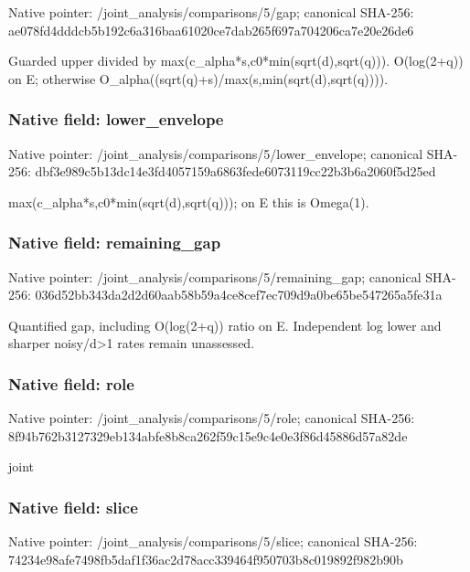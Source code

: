 \documentclass[10pt,a4paper]{article}
\begin{document}
Native pointer: /joint\_analysis/comparisons/5/gap; canonical SHA-256: ae078fd4dddcb5b192c6a316\allowbreak{}baa61020ce7dab265f697a70\allowbreak{}4206ca7e20e26de6


Guarded upper divided by max(c\_alpha*s,c0*min(sqrt(d),sqrt(q))). O(log(2+q)) on E; otherwise O\_alpha((sqrt(q)+s)/max(\allowbreak{}s,min(sqrt(d),sqrt(q))))\allowbreak{}.


\subsubsection{Native field: lower\_envelope}


Native pointer: /joint\_analysis/comparis\allowbreak{}ons/5/lower\_envelope; canonical SHA-256: dbf3e989c5b13dc14e3fd405\allowbreak{}7159a6863fede6073119cc22\allowbreak{}b3b6a2060f5d25ed


max(c\_alpha*s,c0*min(sqrt(d),sqrt(q))); on E this is Omega(1).


\subsubsection{Native field: remaining\_gap}


Native pointer: /joint\_analysis/comparis\allowbreak{}ons/5/remaining\_gap; canonical SHA-256: 036d52bb343da2d2d60aab58\allowbreak{}b59a4ce8cef7ec709d9a0be6\allowbreak{}5be547265a5fe31a


Quantified gap, including O(log(2+q)) ratio on E. Independent log lower and sharper noisy/d>1 rates remain unassessed.


\subsubsection{Native field: role}


Native pointer: /joint\_analysis/comparisons/5/role; canonical SHA-256: 8f94b762b3127329eb134abf\allowbreak{}e8b8ca262f59c15e9c4e0e3f\allowbreak{}86d45886d57a82de


joint


\subsubsection{Native field: slice}


Native pointer: /joint\_analysis/comparisons/5/slice; canonical SHA-256: 74234e98afe7498fb5daf1f3\allowbreak{}6ac2d78acc339464f950703b\allowbreak{}8c019892f982b90b
\end{document}
